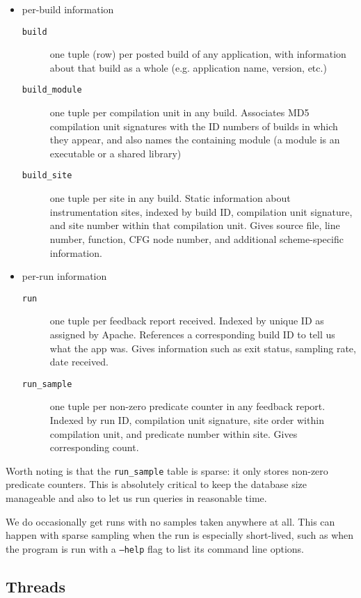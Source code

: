\documentclass[10pt,twocolumn]{article}
\begin{document}
\begin{itemize}
\item per-build information
  \begin{description}
  \item[\texttt{build}] one tuple (row) per posted build of any
    application, with information about that build as a whole (e.g.
    application name, version, etc.)
  \item[\texttt{build\_module}] one tuple per compilation unit in any
    build.  Associates MD5 compilation unit signatures with the ID
    numbers of builds in which they appear, and also names the
    containing module (a module is an executable or a shared library)
  \item[\texttt{build\_site}] one tuple per site in any build.  Static
    information about instrumentation sites, indexed by build ID,
    compilation unit signature, and site number within that
    compilation unit.  Gives source file, line number, function, CFG
    node number, and additional scheme-specific information.
  \end{description}
\item per-run information
  \begin{description}
  \item[\texttt{run}] one tuple per feedback report received.  Indexed
    by unique ID as assigned by Apache.  References a corresponding
    build ID to tell us what the app was.  Gives information such as
    exit status, sampling rate, date received.
  \item[\texttt{run\_sample}] one tuple per non-zero predicate counter
    in any feedback report.  Indexed by run ID, compilation unit
    signature, site order within compilation unit, and predicate
    number within site.  Gives corresponding count.
  \end{description}
\end{itemize}

Worth noting is that the \texttt{run\_sample} table is sparse: it only
stores non-zero predicate counters.  This is absolutely critical to
keep the database size manageable and also to let us run queries in
reasonable time.

We do occasionally get runs with no samples taken anywhere at all.
This can happen with sparse sampling when the run is especially
short-lived, such as when the program is run with a \texttt{--help}
flag to list its command line options.

\subsection{Threads}
\end{document}
